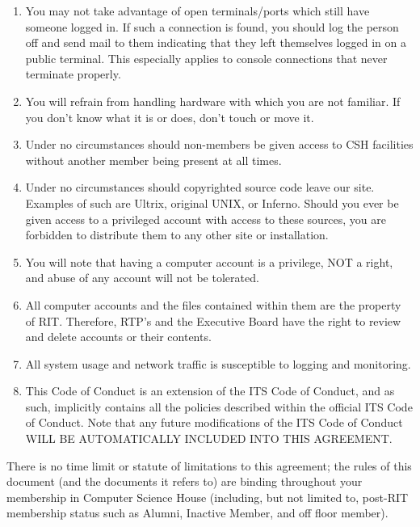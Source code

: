 \documentclass{article}
\begin{document}
\begin{enumerate}[I]
\item You may not take advantage of open terminals/ports which still have
someone logged in. If such a connection is found, you should log the person off
and send mail to them indicating that they left themselves logged in on a public
terminal. This especially applies to console connections that never terminate
properly.

\item You will refrain from handling hardware with which you are not familiar.
If you don't know what it is or does, don't touch or move it.

\item Under no circumstances should non-members be given access to CSH
facilities without another member being present at all times.

\item Under no circumstances should copyrighted source code leave our site.
Examples of such are Ultrix, original UNIX, or Inferno. Should you ever be given
access to a privileged account with access to these sources, you are forbidden
to distribute them to any other site or installation.

\item You will note that having a computer account is a privilege, NOT a right,
and abuse of any account will not be tolerated.

\item All computer accounts and the files contained within them are the property
of RIT. Therefore, RTP’s and the Executive Board have the right to review and
delete accounts or their contents.

\item All system usage and network traffic is susceptible to logging and
monitoring.

\item This Code of Conduct is an extension of the ITS Code of Conduct, and as
such, implicitly contains all the policies described within the official ITS
Code of Conduct. Note that any future modifications of the ITS Code of Conduct
WILL BE AUTOMATICALLY INCLUDED INTO THIS AGREEMENT.
\end{enumerate}

There is no time limit or statute of limitations to this agreement; the rules of
this document (and the documents it refers to) are binding throughout your
membership in Computer Science House (including, but not limited to, post-RIT
membership status such as Alumni, Inactive Member, and off floor member).
\end{document}
